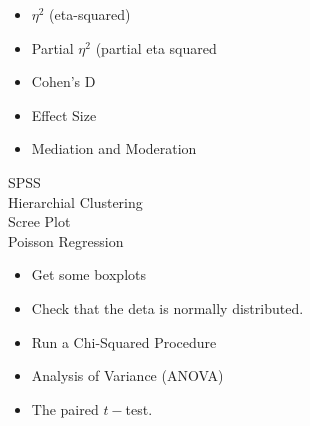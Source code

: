 \documentclass[12pt]{article}
\begin{document}
\begin{itemize}
\item $\eta^2$ (eta-squared)
\item Partial $\eta^2$ (partial eta squared
\item Cohen's D
\item Effect Size
\item Mediation and Moderation
\end{itemize}
SPSS\\
Hierarchial Clustering\\
Scree Plot\\
Poisson Regression\\
\begin{itemize}
\item Get some boxplots 
\item Check that the deta is normally distributed.
\item Run a Chi-Squared Procedure
\item Analysis of Variance (ANOVA)
\item The paired $t-$test.
\end{itemize}
\end{document}

